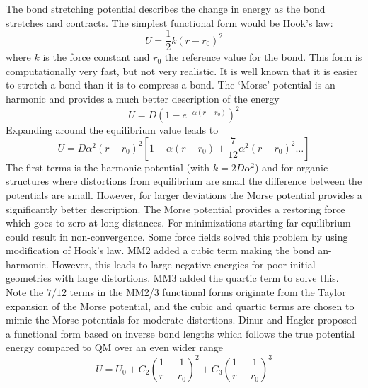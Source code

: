 The bond stretching potential describes the change in energy as the bond stretches and contracts.
The simplest functional form would be Hook's law:
\begin{equation}
  U=\frac{1}{2} k \left(r-r_0\right)^2
\end{equation}
where $k$ is the force constant and $r_0$ the reference value for the bond. This form is computationally
very fast, but not very realistic. It is well known that it is easier to stretch a bond than it is to
compress a bond. The `Morse' potential is an-harmonic and provides a much better description of the energy
\begin{equation}
  U= D\left(1-e^{-\alpha\left(r-r_0\right)}\right)^2
\end{equation}
Expanding around the equilibrium value leads to
\begin{equation}
 U=D\alpha^2\left(r-r_0\right)^2\left[1-\alpha\left(r-r_0\right)+\frac{7}{12}\alpha^2\left(r-r_0\right)^2\dots\right]
\end{equation}
The first terms is the harmonic potential (with $k=2D\alpha^2$) and for organic structures where distortions
from equilibrium are small the difference between the potentials are small. However, for larger deviations
the Morse potential provides a significantly better description.
The Morse potential provides a restoring force which goes to zero at long distances. For minimizations
starting far equilibrium could result in non-convergence. Some force fields solved this problem by
using modification of Hook's law. MM2 added a cubic term making the bond an-harmonic. However, this leads to large
negative energies for poor initial geometries with large distortions. MM3 added the quartic term to solve this.
Note the $7/12$ terms in the MM2/3 functional forms originate from the Taylor expansion of the Morse potential,
and the cubic and quartic terms are chosen to mimic the Morse potentials for moderate distortions.
Dinur and Hagler proposed a functional form based on inverse bond lengths which follows the true potential energy
compared to QM over an even wider range
\begin{equation}
 U=U_0+C_2\left(\frac{1}{r}-\frac{1}{r_0}\right)^2+C_3\left(\frac{1}{r}-\frac{1}{r_0}\right)^3
\end{equation}

